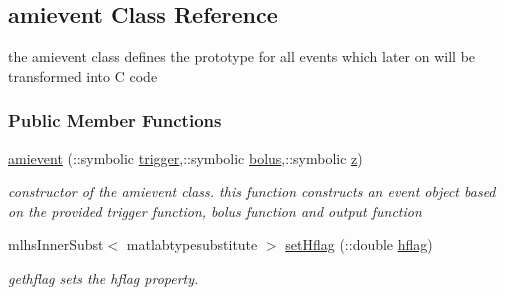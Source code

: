 \hypertarget{classamievent}{}\subsection{amievent Class Reference}
\label{classamievent}


the amievent class defines the prototype for all events which later on will be transformed into C code  


\subsubsection*{Public Member Functions}
\begin{DoxyCompactItemize}
\item 
\hyperlink{classamievent_aa89b0efd53c33a18acf04c1dda76842c}{amievent} (\+::symbolic \hyperlink{classamievent_ae194cb817eae4085f8023885100c68dd}{trigger},\+::symbolic \hyperlink{classamievent_ab9227561ac246ee4b70f9e65c25ffda7}{bolus},\+::symbolic \hyperlink{classamievent_a25ed1bcb423b0b7200f485fc5ff71c8e}{z})
\begin{DoxyCompactList}\small\item\em constructor of the amievent class. this function constructs an event object based on the provided trigger function, bolus function and output function \end{DoxyCompactList}\item 
mlhs\+Inner\+Subst$<$ matlabtypesubstitute $>$ \hyperlink{classamievent_aef1933f186f69e58e2aa1b00d01f75e7}{set\+Hflag} (\+::double \hyperlink{classamievent_ab98347b5ce6fbe7bd007030346b88575}{hflag})
\begin{DoxyCompactList}\small\item\em gethflag sets the hflag property. \end{DoxyCompactList}\end{DoxyCompactItemize}
